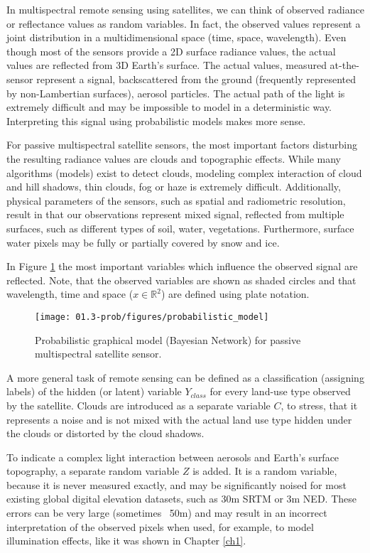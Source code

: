 In multispectral remote sensing using satellites, we can think of observed radiance or reflectance values as random variables. In fact, the observed values represent a joint distribution in a multidimensional space (time, space, wavelength). Even though most of the sensors provide a 2D surface radiance values, the actual values are reflected from 3D Earth's surface. The actual values, measured at-the-sensor represent a signal, backscattered from the ground (frequently represented by non-Lambertian surfaces), aerosol particles. The actual path of the light is extremely difficult and may be impossible to model in a deterministic way. Interpreting this signal using probabilistic models makes more sense.

For passive multispectral satellite sensors, the most important factors disturbing the resulting radiance values are clouds and topographic effects. While many algorithms (models) exist to detect clouds, modeling complex interaction of cloud and hill shadows, thin clouds, fog or haze is extremely difficult. Additionally, physical parameters of the sensors, such as spatial and radiometric resolution, result in that our observations represent mixed signal, reflected from multiple surfaces, such as different types of soil, water, vegetations. Furthermore, surface water pixels may be fully or partially covered by snow and ice.

In Figure \ref{fig:pgm} the most important variables which influence the observed signal are reflected. Note, that the observed variables are shown as shaded circles and that wavelength, time and space ($x \in \mathbb{R}^2$) are defined using plate notation.

\begin{figure}
	\centering
	\texttt{[image: 01.3-prob/figures/probabilistic\_model]} 
	\caption{Probabilistic graphical model (Bayesian Network) for passive multispectral satellite sensor.}
	\label{fig:pgm}
\end{figure}

A more general task of remote sensing can be defined as a classification (assigning labels) of the hidden (or latent) variable $Y_{class}$ for every land-use type observed by the satellite. Clouds are introduced as a separate variable $C$, to stress, that it represents a noise and is not mixed with the actual land use type hidden under the clouds or distorted by the cloud shadows. 

To indicate a complex light interaction between aerosols and Earth's surface topography, a separate random variable $Z$ is added. It is a random variable, because it is never measured exactly, and may be significantly noised for most existing global digital elevation datasets, such as 30m SRTM or 3m NED. These errors can be very large (sometimes ~50m) and may result in an incorrect interpretation of the observed pixels when used, for example, to model illumination effects, like it was shown in Chapter \ref{ch1}.

